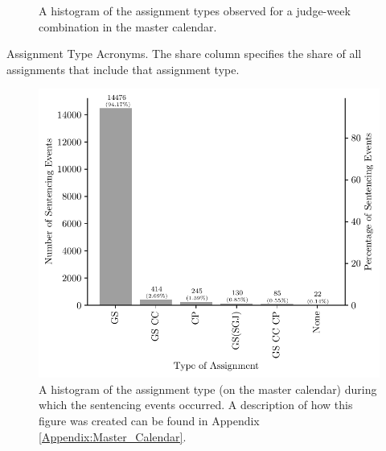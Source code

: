 \documentclass[11pt, oneside]{article}   	%
\theoremstyle{ModifiedStyle}
\begin{document}
\begin{figure}[H]
\begin{minipage}{0.45\textwidth}
					\vspace*{-1mm}
					\caption{A histogram of the assignment types observed for a judge-week combination in the master calendar.}
					\label{Figure_Assignment_Type_Histogram}
				\end{minipage}
			\end{figure}

      \begin{table}[H]
        \centering
        \caption{Assignment Type Acronyms. The share column specifies the share of all assignments that include that assignment type.}
        \label{tab-assignment-types}
        
      \end{table}

			\begin{figure}[H]
				\centering
				\includegraphics[scale=0.75]{Figures/Type_of_Court_Assignment_Sentencing_Event_Histogram}
				\caption{A histogram of the assignment type (on the master calendar) during which the sentencing events occurred. A description of how this figure was created can be found in Appendix \ref{Appendix:Master_Calendar}.}
				\label{Figure_Assignment_Type_Sentencing_Event_Histogram}
			\end{figure}

\end{document}
